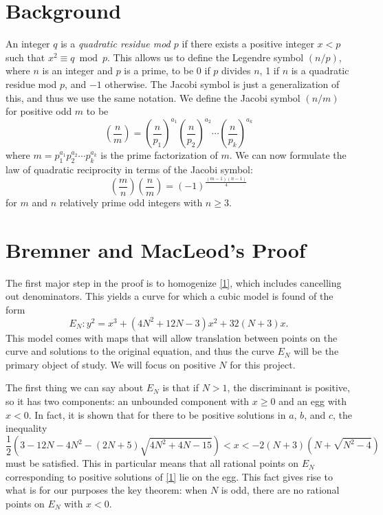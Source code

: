 \documentclass[12pt]{article}
\theoremstyle{definition}
\begin{document}
\section{Background}
An integer $q$ is a \textit{quadratic residue mod $p$} if there exists a positive integer $x < p$ such that $x^2 \equiv q \bmod p$.
This allows us to define the Legendre symbol $(n/p)$, where $n$ is an integer and $p$ is a prime, to be 0 if $p$ divides $n$, 1 if $n$ is a quadratic residue mod $p$, and $-1$ otherwise.
The Jacobi symbol is just a generalization of this, and thus we use the same notation.
We define the Jacobi symbol $(n/m)$ for positive odd $m$ to be \begin{equation*}
	\left( \frac{n}{m } \right) = \left( \frac{n}{p_1} \right)^{a_1}\left( \frac{n}{p_2} \right)^{a_2}\cdots\left( \frac{n}{p_k} \right)^{a_k}
\end{equation*}
where $m=p_1^{a_1}p_2^{a_2}\cdots p_k^{a_k}$ is the prime factorization of $m$.
We can now formulate the law of quadratic reciprocity in terms of the Jacobi symbol: \begin{equation*}
	\left( \frac{m }{n} \right)\left( \frac{n}{m } \right) = (-1)^{\frac{(m-1)(n-1)}{4}}
\end{equation*}
for $m$ and $n$ relatively prime odd integers with $n \geq 3$.

\section{Bremner and MacLeod's Proof}
The first major step in the proof is to homogenize \eqref{1}, which includes cancelling out denominators.
This yields a curve for which a cubic model is found of the form \begin{equation*}
	E_N : y^2 = x^3 + (4N^2 + 12N - 3) x^2 + 32(N+3)x.
\end{equation*}
This model comes with maps that will allow translation between points on the curve and solutions to the original equation, and thus the curve $E_N$ will be the primary object of study.
We will focus on positive $N$ for this project.

The first thing we can say about $E_N$ is that if $N > 1$, the discriminant is positive, so it has two components: an unbounded component with $x \geq 0$ and an egg with $x < 0$.
In fact, it is shown that for there to be positive solutions in $a$, $b$, and $c$, the inequality \begin{equation*}
	\frac{1}{2}(3-12N-4N^2-(2N+5)\sqrt{4N^2+4N-15}) < x < -2(N+3)(N+\sqrt{N^2-4})
\end{equation*}
must be satisfied.
This in particular means that all rational points on $E_N$ corresponding to positive solutions of \eqref{1} lie on the egg.
This fact gives rise to what is for our purposes the key theorem: when $N$ is odd, there are no rational points on $E_N$ with $x < 0$.
\end{document}
